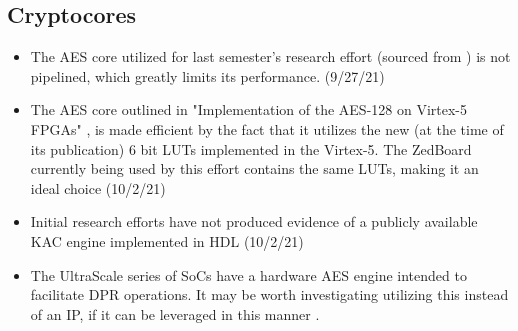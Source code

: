 \subsection{Cryptocores}\label{subsec:Cryptocores}
\begin{itemize}
    \item The AES core utilized for last semester's research effort (sourced from \cite{tsang_aes_2018}) is not pipelined, which greatly limits its performance. (9/27/21)
    \item The AES core outlined in "Implementation of the AES-128 on Virtex-5 FPGAs" \cite{bulens_implementation_2008}, is made efficient by the fact that it utilizes the new (at the time of its publication) 6 bit LUTs implemented in the Virtex-5. The ZedBoard currently being used by this effort contains the same LUTs, making it an ideal choice (10/2/21)
    \item Initial research efforts have not produced evidence of a publicly available KAC engine implemented in HDL (10/2/21)
    \item The UltraScale series of SoCs have a hardware AES engine intended to facilitate DPR operations. It may be worth investigating utilizing this instead of an IP, if it can be leveraged in this manner \cite{noauthor_using_2021}.
\end{itemize}